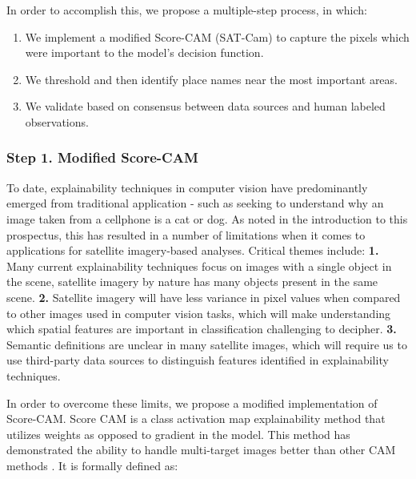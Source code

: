 In order to accomplish this, we propose a multiple-step process, in which:
\begin{enumerate} [itemsep=-1ex]
    \item We implement a modified Score-CAM (SAT-Cam) to capture the pixels which were important to the model's decision function.
    \item We threshold and then identify place names near the most important areas.
    \item We validate based on consensus between data sources and human labeled observations.
\end{enumerate}

\subsubsection{Step 1. Modified Score-CAM}
To date, explainability techniques in computer vision have predominantly emerged from traditional application - such as seeking to understand why an image taken from a cellphone is a cat or dog.  As noted in the introduction to this prospectus, this has resulted in a number of limitations when it comes to applications for satellite imagery-based analyses.  Critical themes include: \textbf{1.} Many current explainability techniques focus on images with a single object in the scene, satellite imagery by nature has many objects present in the same scene.  \textbf{2.} Satellite imagery will have less variance in pixel values when compared to other images used in computer vision tasks, which will make understanding which spatial features are important in classification challenging to decipher.  \textbf{3.} Semantic definitions are unclear in many satellite images, which will require us to use third-party data sources to distinguish features identified in explainability techniques.   


In order to overcome these limits, we propose a modified implementation of Score-CAM.  Score CAM is a class activation map explainability method that utilizes weights as opposed to gradient in the model.  This method has demonstrated the ability to handle multi-target images better than other CAM methods \citep{wang2020score}.  It is formally defined as: 

